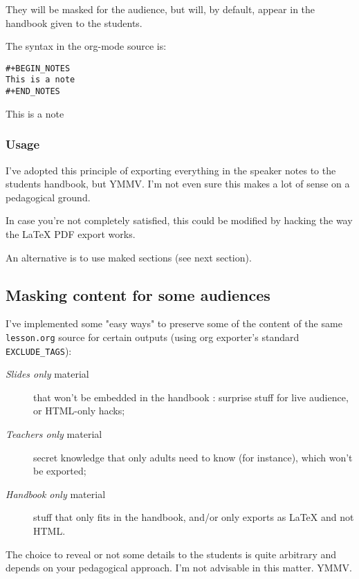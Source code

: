 \documentclass[a4paper]{article}
\begin{document}
They will be masked for the audience, but will, by default, appear in the handbook given to the students.

The syntax in the org-mode source is:
\begin{verbatim}
#+BEGIN_NOTES
This is a note
#+END_NOTES
\end{verbatim}

\begin{NOTES}
This is a note
\end{NOTES}

\subsubsection{Usage}
\label{sec:org7f86178}

I've adopted this principle of exporting everything in the speaker
notes to the students handbook, but YMMV. I'm not even sure this makes
a lot of sense on a pedagogical ground.

In case you're not completely satisfied, this could be modified by
hacking the way the \LaTeX{} PDF export works.

An alternative is to use maked sections (see next section).

\subsection{Masking content for some audiences}
\label{sec:orgac9425b}

I've implemented some "easy ways" to preserve some of the content of the same \texttt{lesson.org} source for certain outputs (using org exporter's standard \texttt{EXCLUDE\_TAGS}):

\begin{description}
\item[{\emph{Slides only} material}] that won't be embedded in the handbook : surprise stuff for live audience, or HTML-only hacks;
\item[{\emph{Teachers only} material}] secret knowledge that only adults need
to know (for instance), which won't be exported;
\end{description}
\begin{description}
\item[{\emph{Handbook only} material}] stuff that only fits in the handbook, and/or only exports as \LaTeX{} and not HTML.
\end{description}

\begin{NOTES}
The choice to reveal or not some details to the students is quite arbitrary and depends on your pedagogical approach. I'm not advisable in this matter. YMMV.
\end{NOTES}
\end{document}
